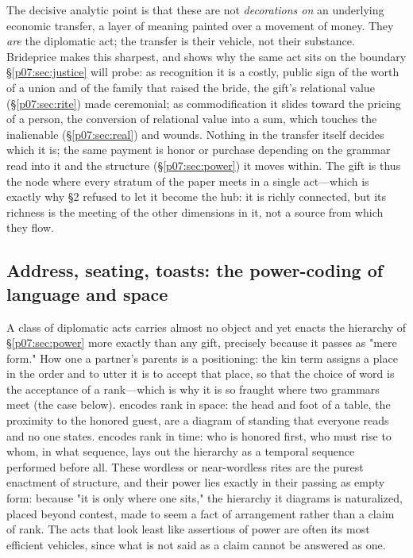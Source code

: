 \documentclass[11pt,a4paper]{article}
\newcommand{\emb}[1]{\textcolor{rose}{\oldtextbf{#1}}}
\newcommand{\xref}[1]{\textcolor{rose}{\S\ref{#1}}}
\newcommand{\pinkref}[1]{\textcolor{rose}{#1}}
\begin{document}
The decisive analytic point is that these are not \emph{decorations on} an underlying economic transfer, a layer of meaning painted over a movement of money. They \emph{are} the diplomatic act; the transfer is their vehicle, not their substance. Brideprice makes this sharpest, and shows why the same act sits on the boundary \xref{p07:sec:justice} will probe: as recognition it is a costly, public sign of the worth of a union and of the family that raised the bride, the gift's relational value (\xref{p07:sec:rite}) made ceremonial; as commodification it slides toward the pricing of a person, the conversion of relational value into a sum, which touches the inalienable (\xref{p07:sec:real}) and wounds. Nothing in the transfer itself decides which it is; the same payment is honor or purchase depending on the grammar read into it and the structure (\xref{p07:sec:power}) it moves within. The gift is thus the node where every stratum of the paper meets in a single act---which is exactly why \pinkref{§2} refused to let it become the hub: it is richly connected, but its richness is the meeting of the other dimensions in it, not a source from which they flow.

\subsection{Address, seating, toasts: the power-coding of language and space}
A class of diplomatic acts carries almost no object and yet enacts the hierarchy of \xref{p07:sec:power} more exactly than any gift, precisely because it passes as "mere form." How one \emb{addresses} a partner's parents is a positioning: the kin term assigns a place in the order and to utter it is to accept that place, so that the choice of word is the acceptance of a rank---which is why it is so fraught where two grammars meet (the case below). \emb{Seating} encodes rank in space: the head and foot of a table, the proximity to the honored guest, are a diagram of standing that everyone reads and no one states. \emb{The order of toasts} encodes rank in time: who is honored first, who must rise to whom, in what sequence, lays out the hierarchy as a temporal sequence performed before all. These wordless or near-wordless rites are the purest enactment of structure, and their power lies exactly in their passing as empty form: because "it is only where one sits," the hierarchy it diagrams is naturalized, placed beyond contest, made to seem a fact of arrangement rather than a claim of rank. The acts that look least like assertions of power are often its most efficient vehicles, since what is not said as a claim cannot be answered as one.
\end{document}
